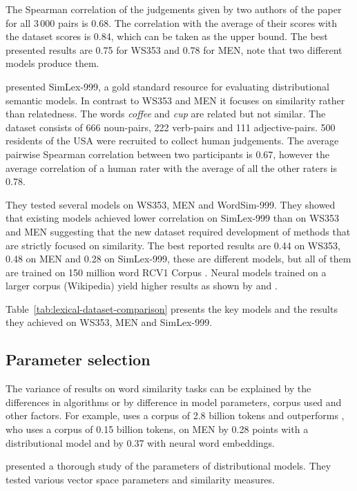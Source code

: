 The Spearman correlation of the judgements given by two authors of the paper for all 3\,000 pairs is 0.68. The correlation with the average of their scores with the dataset scores is 0.84, which can be taken as the upper bound. The best presented results are 0.75 for WS353 and 0.78 for MEN, note that two different models produce them.

 presented SimLex-999, a gold standard resource for evaluating distributional semantic models. In contrast to WS353 and MEN it focuses on similarity rather than relatedness. The words \textit{coffee} and \textit{cup} are related but not similar. The dataset consists of 666 noun-pairs, 222 verb-pairs and 111 adjective-pairs. 500 residents of the USA were recruited to collect human judgements. The average pairwise Spearman correlation between two participants is 0.67, however the average correlation of a human rater with the average of all the other raters is 0.78.

They tested several models on WS353, MEN and WordSim-999. They showed that existing models achieved lower correlation on SimLex-999 than on WS353 and MEN suggesting that the new dataset required development of methods that are strictly focused on similarity. The best reported results are 0.44 on WS353, 0.48 on MEN and 0.28 on SimLex-999, these are different models, but all of them are trained on 150 million word RCV1 Corpus \cite{lewis2004rcv1}. Neural models trained on a larger corpus (Wikipedia) yield higher results as shown by  and .

Table~\ref{tab:lexical-dataset-comparison} presents the key models and the results they achieved on WS353, MEN and SimLex-999.

\subsection{Parameter selection}
\label{sec:parameter-selection-intro}

The variance of results on word similarity tasks can be explained by the differences in algorithms or by difference in model parameters, corpus used and other factors. For example,  uses a corpus of 2.8 billion tokens and outperforms , who uses a corpus of 0.15 billion tokens, on MEN by 0.28 points with a distributional model and by 0.37 with neural word embeddings.

 presented a thorough study of the parameters of distributional models. They tested various vector space parameters and similarity measures.

